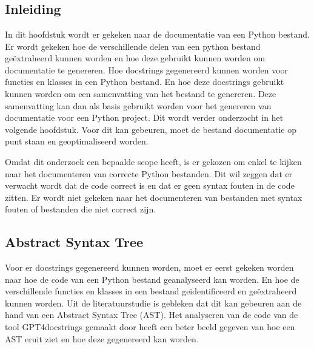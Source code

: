 
\chapter{}%
\label{ch:bestanddocumentatie}

\section{Inleiding}
\label{sec:bestanddocumentatie-inleiding}
In dit hoofdstuk wordt er gekeken naar de documentatie van een Python bestand.
Er wordt gekeken hoe de verschillende delen van een python bestand geëxtraheerd kunnen worden en hoe deze gebruikt kunnen worden om documentatie te genereren.
Hoe docstrings gegenereerd kunnen worden voor functies en klasses in een Python bestand.
En hoe deze docstrings gebruikt kunnen worden om een samenvatting van het bestand te genereren.
Deze samenvatting kan dan als basis gebruikt worden voor het genereren van documentatie voor een Python project.
Dit wordt verder onderzocht in het volgende hoofdstuk.
Voor dit kan gebeuren, moet de bestand documentatie op punt staan en geoptimaliseerd worden.

Omdat dit onderzoek een bepaalde scope heeft, is er gekozen om enkel te kijken naar het documenteren van correcte Python bestanden.
Dit wil zeggen dat er verwacht wordt dat de code correct is en dat er geen syntax fouten in de code zitten.
Er wordt niet gekeken naar het documenteren van bestanden met syntax fouten of bestanden die niet correct zijn.

\section{Abstract Syntax Tree}
\label{sec:bestanddocumentatie-ast}
Voor er docstrings gegenereerd kunnen worden, moet er eerst gekeken worden naar hoe de code van een Python bestand geanalyseerd kan worden.
En hoe de verschillende functies en klasses in een bestand geïdentificeerd en geëxtraheerd kunnen worden.
Uit de literatuurstudie is gebleken dat dit kan gebeuren aan de hand van een Abstract Syntax Tree (AST).
Het analyseren van de code van de tool GPT4docstrings gemaakt door \textcite{Trofficus2023} heeft een beter beeld gegeven van hoe een AST eruit ziet en hoe deze gegenereerd kan worden.

